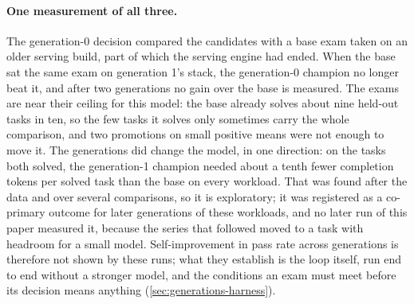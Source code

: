 \paragraph{One measurement of all three.} The generation-0 decision compared the candidates with
a base exam taken on an older serving build, part of which the serving engine had ended. When the
base sat the same exam on generation 1's stack, the generation-0 champion no longer beat
it, and after two generations no gain over the base is measured. The exams are
near their ceiling for this model: the base already solves about nine held-out tasks in ten, so the
few tasks it solves only sometimes carry the whole comparison, and two promotions on small
positive means were not enough to move it. The generations did change the model, in one direction: on the tasks both solved, the
generation-1 champion needed about a tenth fewer completion tokens per solved task than the base on every
workload. That was found after the data and over several comparisons, so it is exploratory; it
was registered as a co-primary outcome for later generations of these workloads, and no later
run of this paper measured it, because the series that followed moved to a task with headroom for a
small model.
Self-improvement in pass rate across generations is therefore not shown by these runs; what they establish is the loop itself, run end to end without a stronger
model, and the conditions an exam must meet before its decision means anything
(\cref{sec:generations-harness}).
